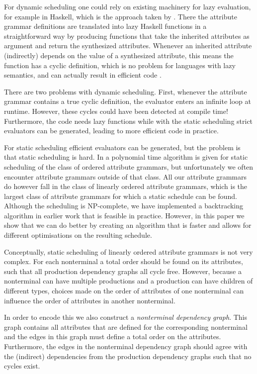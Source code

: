 \documentclass{llncs}
\begin{document}
For dynamic scheduling one could rely on existing machinery for lazy evaluation, for example in Haskell, which is the approach taken by \cite{saraiva99}. There the attribute grammar definitions are translated into lazy Haskell functions in a straightforward way by producing functions that take the inherited attributes as argument and return the synthesized attributes. Whenever an inherited attribute (indirectly) depends on the value of a synthesized attribute, this means the function has a cyclic definition, which is no problem for languages with lazy semantics, and can actually result in efficient code \cite{Bird:1984}.

There are two problems with dynamic scheduling. First, whenever the attribute grammar contains a true cyclic definition, the evaluator enters an infinite loop at runtime. However, these cycles could have been detected at compile time! Furthermore, the code needs lazy functions while with the static scheduling strict evaluators can be generated, leading to more efficient code in practice.

For static scheduling efficient evaluators can be generated, but the problem is that static scheduling is hard. In \cite{kastens80} a polynomial time algorithm is given for static scheduling of the class of ordered attribute grammars, but unfortunately we often encounter attribute grammars outside of that class. All our attribute grammars do however fall in the class of linearly ordered attribute grammars, which is the largest class of attribute grammars for which a static schedule can be found. Although the scheduling is NP-complete, we have implemented a backtracking algorithm in earlier work \cite{Binsbergen:2015} that is feasible in practice. However, in this paper we show that we can do better by creating an algorithm that is faster and allows for different optimisations on the resulting schedule.

Conceptually, static scheduling of linearly ordered attribute grammars is not very complex. For each nonterminal a total order should be found on its attributes, such that all production dependency graphs all cycle free. However, because a nonterminal can have multiple productions and a production can have children of different types, choices made on the order of attributes of one nonterminal can influence the order of attributes in another nonterminal.

In order to encode this we also construct a \emph{nonterminal dependency graph}. This graph contains all attributes that are defined for the corresponding nonterminal and the edges in this graph must define a total order on the attributes. Furthermore, the edges in the nonterminal dependency graph should agree with the (indirect) dependencies from the production dependency graphs such that no cycles exist.
\end{document}
